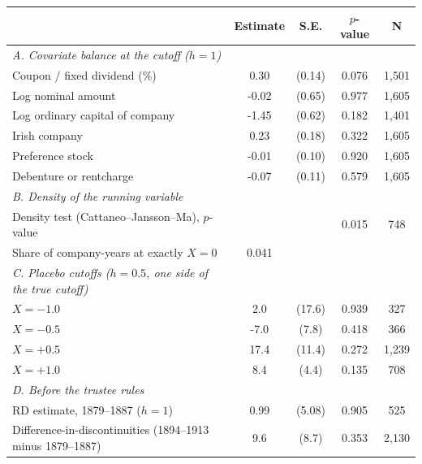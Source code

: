 \begin{tabular}{lcccc}
\toprule
 & Estimate & S.E. & $p$-value & N \\
\midrule
\textit{A. Covariate balance at the cutoff ($h = 1$)} &  &  &  &  \\
\quad Coupon / fixed dividend (\%) & 0.30 & (0.14) & 0.076 & 1,501 \\
\quad Log nominal amount & -0.02 & (0.65) & 0.977 & 1,605 \\
\quad Log ordinary capital of company & -1.45 & (0.62) & 0.182 & 1,401 \\
\quad Irish company & 0.23 & (0.18) & 0.322 & 1,605 \\
\quad Preference stock & -0.01 & (0.10) & 0.920 & 1,605 \\
\quad Debenture or rentcharge & -0.07 & (0.11) & 0.579 & 1,605 \\
\textit{B. Density of the running variable} &  &  &  &  \\
\quad Density test (Cattaneo--Jansson--Ma), $p$-value &  &  & 0.015 & 748 \\
\quad Share of company-years at exactly $X = 0$ & 0.041 &  &  &  \\
\textit{C. Placebo cutoffs ($h = 0.5$, one side of the true cutoff)} &  &  &  &  \\
\quad $X = -1.0$ & 2.0 & (17.6) & 0.939 & 327 \\
\quad $X = -0.5$ & -7.0 & (7.8) & 0.418 & 366 \\
\quad $X = +0.5$ & 17.4 & (11.4) & 0.272 & 1,239 \\
\quad $X = +1.0$ & 8.4 & (4.4) & 0.135 & 708 \\
\textit{D. Before the trustee rules} &  &  &  &  \\
\quad RD estimate, 1879--1887 ($h = 1$) & 0.99 & (5.08) & 0.905 & 525 \\
\quad Difference-in-discontinuities (1894--1913 minus 1879--1887) & 9.6 & (8.7) & 0.353 & 2,130 \\
\bottomrule
\end{tabular}
